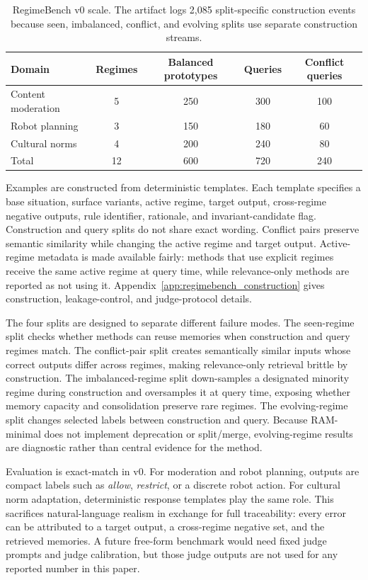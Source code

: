 \documentclass{article} %
\begin{document}
\begin{table}[t]
\centering
\scriptsize
\begin{tabular}{@{}lcccc@{}}
\toprule
\textbf{Domain} & \textbf{Regimes} & \textbf{Balanced prototypes} & \textbf{Queries} & \textbf{Conflict queries} \\
\midrule
Content moderation & 5 & 250 & 300 & 100 \\
Robot planning & 3 & 150 & 180 & 60 \\
Cultural norms & 4 & 200 & 240 & 80 \\
\midrule
Total & 12 & 600 & 720 & 240 \\
\bottomrule
\end{tabular}
\caption{RegimeBench v0 scale. The artifact logs 2,085 split-specific construction events because seen, imbalanced, conflict, and evolving splits use separate construction streams.}
\label{tab:regimebench_scale}
\end{table}

Examples are constructed from deterministic templates.
Each template specifies a base situation, surface variants, active regime, target output, cross-regime negative outputs, rule identifier, rationale, and invariant-candidate flag.
Construction and query splits do not share exact wording.
Conflict pairs preserve semantic similarity while changing the active regime and target output.
Active-regime metadata is made available fairly: methods that use explicit regimes receive the same active regime at query time, while relevance-only methods are reported as not using it.
Appendix~\ref{app:regimebench_construction} gives construction, leakage-control, and judge-protocol details.

The four splits are designed to separate different failure modes.
The seen-regime split checks whether methods can reuse memories when construction and query regimes match.
The conflict-pair split creates semantically similar inputs whose correct outputs differ across regimes, making relevance-only retrieval brittle by construction.
The imbalanced-regime split down-samples a designated minority regime during construction and oversamples it at query time, exposing whether memory capacity and consolidation preserve rare regimes.
The evolving-regime split changes selected labels between construction and query.
Because RAM-minimal does not implement deprecation or split/merge, evolving-regime results are diagnostic rather than central evidence for the method.

Evaluation is exact-match in v0.
For moderation and robot planning, outputs are compact labels such as \textit{allow}, \textit{restrict}, or a discrete robot action.
For cultural norm adaptation, deterministic response templates play the same role.
This sacrifices natural-language realism in exchange for full traceability: every error can be attributed to a target output, a cross-regime negative set, and the retrieved memories.
A future free-form benchmark would need fixed judge prompts and judge calibration, but those judge outputs are not used for any reported number in this paper.
\end{document}

